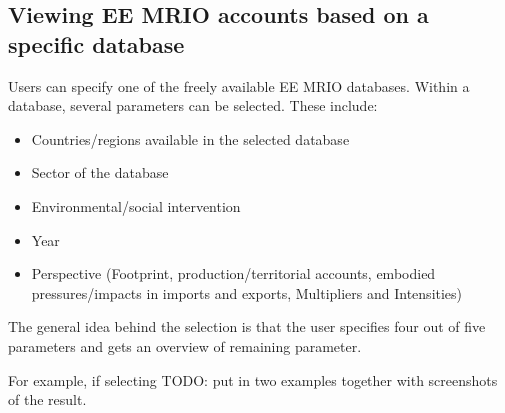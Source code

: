 \subsection{Viewing EE MRIO accounts based on a specific database}

Users can specify one of the freely available EE MRIO databases. 
Within a database, several parameters can be selected. These include:

\begin{itemize}
    \item Countries/regions available in the selected database
    \item Sector of the database
    \item Environmental/social intervention
    \item Year
    \item Perspective (Footprint, production/territorial accounts, embodied
      pressures/impacts in imports and exports, Multipliers and Intensities)
\end{itemize}


The general idea behind the selection is that the user specifies four out
of five parameters and gets an overview of remaining parameter.

For example, if selecting TODO: put in two examples together with
screenshots of the result.